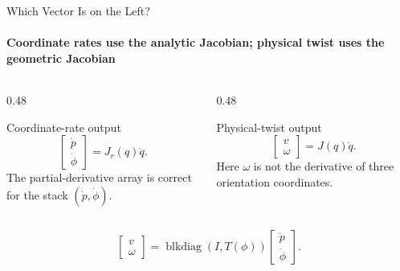 \documentclass[aspectratio=169]{beamer}
\begin{document}
\begin{frame}[t]{Which Vector Is on the Left?}
    \framesubtitle{Coordinate rates use the analytic Jacobian; physical twist uses the geometric Jacobian}
    \begin{columns}[T,onlytextwidth]
        \begin{column}{0.48\textwidth}
            \begin{block}{Coordinate-rate output}
                \[
                    \begin{bmatrix}\dot p\\\dot\phi\end{bmatrix}
                    =J_r(q)\dot q.
                \]
                The partial-derivative array is correct for the stack $(\dot p,\dot\phi)$.
            \end{block}
        \end{column}
        \begin{column}{0.48\textwidth}
            \begin{block}{Physical-twist output}
                \[
                    \begin{bmatrix}v\\\omega\end{bmatrix}
                    =J(q)\dot q.
                \]
                Here $\omega$ is not the derivative of three orientation coordinates.
            \end{block}
        \end{column}
    \end{columns}
    \[
        \begin{bmatrix}v\\\omega\end{bmatrix}
        =\operatorname{blkdiag}(I,T(\phi))
        \begin{bmatrix}\dot p\\\dot\phi\end{bmatrix}.
    \]
\end{frame}
\end{document}
